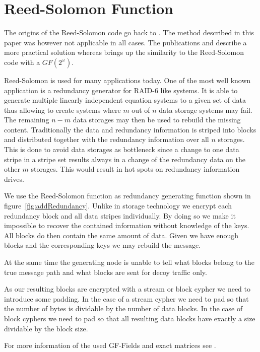 \documentclass[9pt,journal,compsoc]{IEEEtran}
\begin{document}
\appendices

\section{Reed-Solomon Function\label{sec:reedSolomon}}
The origins of the Reed-Solomon code go back to \cite{reed1960polynomial}. The method described in this paper was however not applicable in all cases. The publications \cite{karnin1983secret} and \cite{Rabin:1989:EDI:62044.62050} describe a more practical solution whereas \cite{preparata1989holographic} brings up the similarity to the Reed-Solomon code with a $GF(2^\omega)$. 

Reed-Solomon is used for many applications today. One of the most well known application is a redundancy generator for RAID-6 like systems. It is able to generate multiple linearly independent equation systems to a given set of data thus allowing to create systems where $m$ out of $n$ data storage systems may fail. The remaining  $n-m$ data storages may then be used to rebuild the missing content. Traditionally the data and redundancy information is striped into blocks and distributed together with the redundancy information over all $n$ storages. This is done to avoid data storages as bottleneck since a change to one data stripe  in a stripe set results always in a change of the redundancy data on the other $m$ storages. This would result in hot spots on redundancy information drives.

We use the Reed-Solomon function as redundancy generating function shown in figure~\ref{fig:addRedundancy}. Unlike in storage technology we encrypt each redundancy block and all data stripes individually. By doing so we make it impossible to recover the contained information without knowledge of the keys. All blocks do then contain the same amount of data. Given we have enough blocks and the corresponding keys we may rebuild the message. 

At the same time the generating node is unable to tell what blocks belong to the true message path and what blocks are sent for decoy traffic only. 

As our resulting blocks are encrypted with a stream or block cypher we need to introduce some padding. In the case of a stream cypher we need to pad so that the number of bytes is dividable by the number of data blocks. In the case of block cyphers we need to pad so that all resulting data blocks have exactly a size dividable by the block size.

For more information of the used GF-Fields and exact matrices see \cite{messageVortex}.
\end{document}

